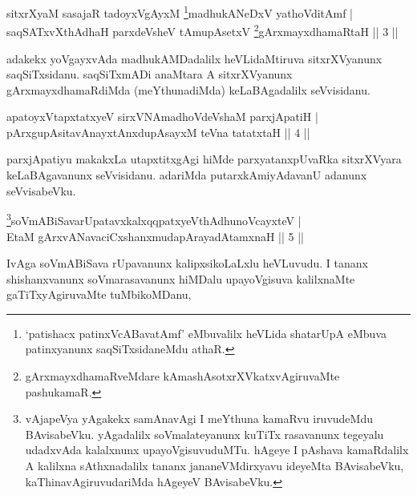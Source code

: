 

\begin{shl}
sitxrXyaM sasajaR tadoyxVgAyxM \footnote{`patishacx patinxVcABavatAmf' eMbuvalilx heVLida shatarUpA eMbuva patinxyanunx saqSiTxsidaneMdu athaR.}madhukANeDxV yathoVditAmf | \\
saqSATxvX\s thAdhaH parxdeVsheV tAmupAsetxV \footnote{gArxmayxdhamaRveMdare kAmashAsotxrXVkatxvAgiruvaMte pashukamaR.}gArxmayxdhamaRtaH \hfill|| 3 || 
\end{shl}


\begin{artha}
adakekx yoVgayxvAda madhukAMDadalilx heVLidaMtiruva sitxrXVyanunx 
saqSiTxsidanu. saqSiTxmADi anaMtara A sitxrXVyanunx 
gArxmayxdhamaRdiMda (meYthunadiMda) keLaBAgadalilx seVvisidanu.
\end{artha}


\begin{shl}
apatoyxVtapxtatxyeV sirxVNAmadhoVdeVshaM parxjApatiH | \\
pArxgupAsitavAnayxtAnxdupAsayxM teVna tatatxtaH \hfill|| 4 || 
\end{shl}

\begin{artha}
parxjApatiyu makakxLa utapxtitxgAgi hiMde parxyatanxpUvaRka 
sitxrXVyara keLaBAgavanunx seVvisidanu. adariMda putarxkAmiyAdavanU 
adanunx seVvisabeVku.
\end{artha}



\begin{shl}
\footnote{vAjapeVya yAgakekx samAnavAgi I meYthuna kamaRvu 
iruvudeMdu BAvisabeVku. yAgadalilx soVmalateyanunx kuTiTx rasavanunx 
tegeyalu udadxvAda kalalxnunx upayoVgisuvuduMTu. hAgeye I pAshava 
kamaRdalilx A kalilxna sAthxnadalilx tananx jananeVMdirxyavu ideyeMta 
BAvisabeVku, kaThinavAgiruvudariMda hAgeyeV BAvisabeVku.}soVmABiSavarUpatavxkalxqqpatxyeV\s thAdhunoVcayxteV | \\
EtaM gArxvANavaciCxshanxmudapArayadAtamxnaH \hfill|| 5 || 
\end{shl}

\begin{artha}
IvAga soVmABiSava rUpavanunx kalipxsikoLaLxlu heVLuvudu. I tananx 
shishanxvanunx soVmarasavanunx hiMDalu upayoVgisuva kalilxnaMte 
gaTiTxyAgiruvaMte tuMbikoMDanu,
\end{artha}

